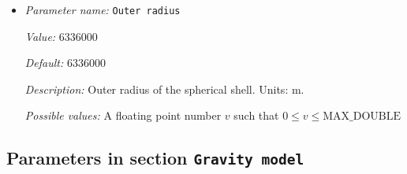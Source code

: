 \begin{itemize}
{\it Value:} 360


{\it Default:} 360


{\it Description:} Opening angle in degrees of the section of the shell that we want to build. The only opening angles that are allowed for this geometry are 90, 180, and 360 in 2d; and 90 and 360 in 3d. Units: degrees.


{\it Possible values:} A floating point number $v$ such that $0 \leq v \leq 360$
\item {\it Parameter name:} {\tt Outer radius}
\label{parameters:Geometry model/Spherical shell/Outer radius}
\label{parameters:Geometry_20model/Spherical_20shell/Outer_20radius}


{\it Value:} 6336000


{\it Default:} 6336000


{\it Description:} Outer radius of the spherical shell. Units: m. 



{\it Possible values:} A floating point number $v$ such that $0 \leq v \leq \text{MAX\_DOUBLE}$
\end{itemize}

\subsection{Parameters in section \tt Gravity model}
\label{parameters:Gravity_20model}

